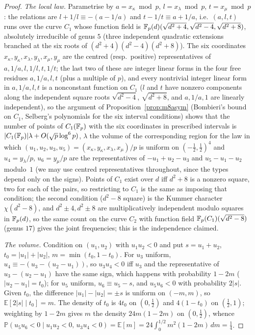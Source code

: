 \begin{proof}
\emph{The local law.}  Parametrise by $a=x_\kappa\bmod p$, $l=x_\lambda\bmod p$, $t=x_\mu\bmod p$: the relations are $l+1/l\equiv-(a-1/a)$
and $t-1/t\equiv a+1/a$, i.e.\ $(a,l,t)$ runs over the curve $C_1$ whose function field is $\mathbb{F}_p(d)(\sqrt{d^2+4},\sqrt{d^2-4},\sqrt{d^2+8})$,
absolutely irreducible of genus $5$ (three independent quadratic extensions branched at the six roots of $(d^2+4)(d^2-4)(d^2+8)$).
The six coordinates $x_\kappa,y_\kappa,x_\lambda,y_\lambda,x_\mu,y_\mu$ are the centred (resp.\ positive) representatives of
$a,1/a,l,1/l,t,1/t$; the last two of these are integer linear forms in the four free residues $a,1/a,l,t$ (plus a multiple of $p$), and every
nontrivial integer linear form in $a,1/a,l,t$ is a nonconstant function on $C_1$ ($l$ and $t$ have nonzero components along the
independent square roots $\sqrt{d^2-4}$, $\sqrt{d^2+8}$, and $a,1/a,1$ are linearly independent), so the argument of
Proposition~\ref{prop:m8asym} (Bombieri's bound on $C_1$, Selberg's polynomials for the six interval conditions) shows that the number of points of $C_1(\mathbb{F}_p)$ with the six coordinates
in prescribed intervals is $|C_1(\mathbb{F}_p)|\lambda+O(\sqrt p\log^6p)$, $\lambda$ the volume of the corresponding region for the law in which
$(u_1,u_2,u_3,u_5)=(x_\kappa,y_\kappa,x_\lambda,x_\mu)/p$ is uniform on $(-\tfrac12,\tfrac12)^4$ and $u_4=y_\lambda/p$, $u_6=y_\mu/p$ are the
representatives of $-u_1+u_2-u_3$ and $u_5-u_1-u_2$ modulo~$1$ (we may use centred representatives throughout, since the types
depend only on the signs).  Points of $C_1$ exist over $d$ iff $d^2+8$ is a nonzero square, two for each of the pairs, so restricting to
$C_1$ is the same as imposing that condition; the second condition ($d^2-8$ square) is the Kummer character $\chi(d^2-8)$, and
$d^2\pm4,d^2\pm8$ are multiplicatively independent modulo squares in $\mathbb{F}_p(d)$, so the same count on the curve $C_2$ with function
field $\mathbb{F}_p(C_1)(\sqrt{d^2-8})$ (genus $17$) gives the joint frequencies; this is the independence claimed.

\emph{The volume.}  Condition on $(u_1,u_2)$ with $u_1u_2<0$ and put $s=u_1+u_2$, $t_0=|u_1|+|u_2|$, $m=\min(t_0,1-t_0)$.  For $u_3$
uniform, $u_4\equiv-(u_3-(u_2-u_1))$, so $u_3u_4<0$ iff $u_3$ and the representative of $u_3-(u_2-u_1)$ have the same sign, which
happens with probability $1-2m$ ($|u_2-u_1|=t_0$); for $u_5$ uniform, $u_6\equiv u_5-s$, and $u_5u_6<0$ with probability $2|s|$.  Given
$t_0$, the difference $|u_1|-|u_2|=\pm s$ is uniform on $(-m,m)$, so $\mathbb E[2|s|\mid t_0]=m$.  The density of $t_0$ is $4t_0$ on
$(0,\tfrac12)$ and $4(1-t_0)$ on $(\tfrac12,1)$; weighting by $1-2m$ gives $m$ the density $24m(1-2m)$ on $(0,\tfrac12)$, whence
$\mathbb P(u_5u_6<0\mid u_1u_2<0,\,u_3u_4<0)=\mathbb E[m]=24\int_0^{1/2}m^2(1-2m)\,dm=\tfrac14$.
\end{proof}

